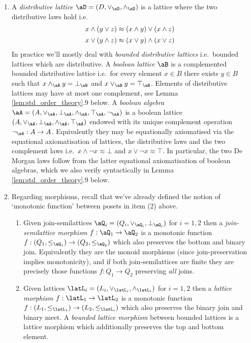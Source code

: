 \documentclass{article}
\begin{document}
\begin{definition}
\begin{enumerate}
\item
A \emph{distributive lattice} $\aD = (D,\lor_\aD,\land_\aD)$ is a lattice where the two distributive laws hold i.e.\
\[
\begin{tabular}{c}
$x \land (y \lor z) \approx (x \land y) \lor (x \land z)$
\\[1ex]
$x \lor (y \land z) \approx (x \lor y) \land (x \lor z)$
\end{tabular}
\]
In practice we'll mostly deal with \emph{bounded distributive lattices} i.e.\ bounded lattices which are distributive. A \emph{boolean lattice} $\aB$ is a complemented bounded distributive lattice i.e.\ for every element $x \in B$ there exists $y \in B$ such that $x \land_\aB y = \bot_\aB$ and $x \lor_\aB y = \top_\aB$. Elements of distributive lattices may have at most one complement, see Lemma \ref{lem:std_order_theory}.9 below. A \emph{boolean algebra} $\aA = (A,\lor_\aA,\bot_\aA,\land_\aA,\top_\aA,\neg_\aA)$ is a boolean lattice $(A,\lor_\aA,\bot_\aA,\land_\aA,\top_\aA)$ endowed with its unique complement operation $\neg_\aA : A \to A$. Equivalently they may be equationally axiomatised via the equational axiomatisation of lattices, the distributive laws and the two complement laws i.e.\ $x \land \neg x \approx \bot$ and $x \lor \neg x \approx \top$. In particular, the two De Morgan laws follow from the latter equational axiomatisation of boolean algebras, which we also verify syntactically in Lemma \ref{lem:std_order_theory}.9 below.

\item
Regarding morphisms, recall that we've already defined the notion of `monotonic function' between posets in item (2) above.

\begin{enumerate}
\item
Given join-semilattices $\aQ_i = (Q_i,\lor_{\aQ_i},\bot_{\aQ_i})$ for $i = 1,2$ then a \emph{join-semilattice morphism} $f : \aQ_1 \to \aQ_2$ is a monotonic function $f : (Q_1,\leq_{\aQ_1}) \to (Q_2,\leq_{\aQ_2})$ which also preserves the bottom and binary join. Equivalently they are the monoid morphisms (since join-preservation implies monotonicity), and if both join-semilattices are finite they are precisely those functions $f : Q_1 \to Q_2$ preserving \emph{all} joins.

\item
Given lattices $\latL_i = (L_i,\lor_{\latL_i},\land_{\latL_i})$ for $i = 1,2$ then a \emph{lattice morphism} $f : \latL_1 \to \latL_2$ is a monotonic function $f : (L_1,\leq_{\latL_1}) \to (L_2,\leq_{\latL_i})$ which also preserves the binary join and binary meet. A \emph{bounded lattice morphism} between bounded lattices is a lattice morphism which additionally preserves the top and bottom element.



\end{enumerate}
\end{enumerate}
\end{definition}
\end{document}
